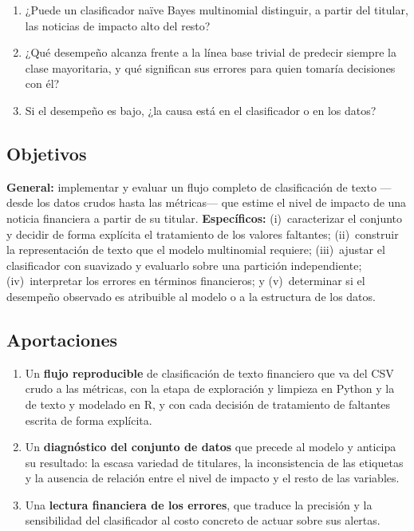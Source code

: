 \documentclass[11pt, a4paper]{article}
\begin{document}
\begin{enumerate}
    \item[\textbf{P1}] ¿Puede un clasificador naïve Bayes multinomial distinguir, a partir del
        titular, las noticias de impacto alto del resto?
    \item[\textbf{P2}] ¿Qué desempeño alcanza frente a la línea base trivial de predecir siempre la
        clase mayoritaria, y qué significan sus errores para quien tomaría decisiones con él?
    \item[\textbf{P3}] Si el desempeño es bajo, ¿la causa está en el clasificador o en los datos?
\end{enumerate}

\subsection{Objetivos}

\textbf{General:} implementar y evaluar un flujo completo de clasificación de texto —desde los
datos crudos hasta las métricas— que estime el nivel de impacto de una noticia financiera a partir
de su titular. \textbf{Específicos:} (i)~caracterizar el conjunto y decidir de forma explícita el
tratamiento de los valores faltantes; (ii)~construir la representación de texto que el modelo
multinomial requiere; (iii)~ajustar el clasificador con suavizado y evaluarlo sobre una partición
independiente; (iv)~interpretar los errores en términos financieros; y (v)~determinar si el
desempeño observado es atribuible al modelo o a la estructura de los datos.

\subsection{Aportaciones}

\begin{enumerate}
    \item Un \textbf{flujo reproducible} de clasificación de texto financiero que va del CSV crudo
        a las métricas, con la etapa de exploración y limpieza en Python y la de texto y modelado
        en R, y con cada decisión de tratamiento de faltantes escrita de forma explícita.
    \item Un \textbf{diagnóstico del conjunto de datos} que precede al modelo y anticipa su
        resultado: la escasa variedad de titulares, la inconsistencia de las etiquetas y la
        ausencia de relación entre el nivel de impacto y el resto de las variables.
    \item Una \textbf{lectura financiera de los errores}, que traduce la precisión y la
        sensibilidad del clasificador al costo concreto de actuar sobre sus alertas.
\end{enumerate}
\end{document}
